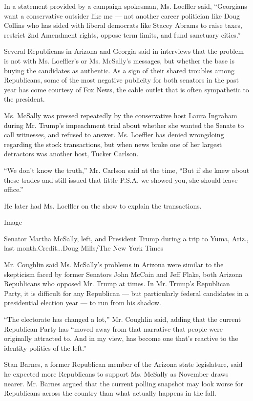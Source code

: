 In a statement provided by a campaign spokesman, Ms. Loeffler said,
``Georgians want a conservative outsider like me --- not another career
politician like Doug Collins who has sided with liberal democrats like
Stacey Abrams to raise taxes, restrict 2nd Amendment rights, oppose term
limits, and fund sanctuary cities.''

Several Republicans in Arizona and Georgia said in interviews that the
problem is not with Ms. Loeffler's or Ms. McSally's messages, but
whether the base is buying the candidates as authentic. As a sign of
their shared troubles among Republicans, some of the most negative
publicity for both senators in the past year has come courtesy of Fox
News, the cable outlet that is often sympathetic to the president.

Ms. McSally was pressed repeatedly by the conservative host Laura
Ingraham during Mr. Trump's impeachment trial about whether she wanted
the Senate to call witnesses, and refused to answer. Ms. Loeffler has
denied wrongdoing regarding the stock transactions, but when news broke
one of her largest detractors was another host, Tucker Carlson.

``We don't know the truth,'' Mr. Carlson said at the time, ``But if she
knew about these trades and still issued that little P.S.A. we showed
you, she should leave office.''

He later had Ms. Loeffler on the show to explain the transactions.

Image

Senator Martha McSally, left, and President Trump during a trip to Yuma,
Ariz., last month.Credit...Doug Mills/The New York Times

Mr. Coughlin said Ms. McSally's problems in Arizona were similar to the
skepticism faced by former Senators John McCain and Jeff Flake, both
Arizona Republicans who opposed Mr. Trump at times. In Mr. Trump's
Republican Party, it is difficult for any Republican --- but
particularly federal candidates in a presidential election year --- to
run from his shadow.

``The electorate has changed a lot,'' Mr. Coughlin said, adding that the
current Republican Party has ``moved away from that narrative that
people were originally attracted to. And in my view, has become one
that's reactive to the identity politics of the left.''

Stan Barnes, a former Republican member of the Arizona state
legislature, said he expected more Republicans to support Ms. McSally as
November draws nearer. Mr. Barnes argued that the current polling
snapshot may look worse for Republicans across the country than what
actually happens in the fall.

